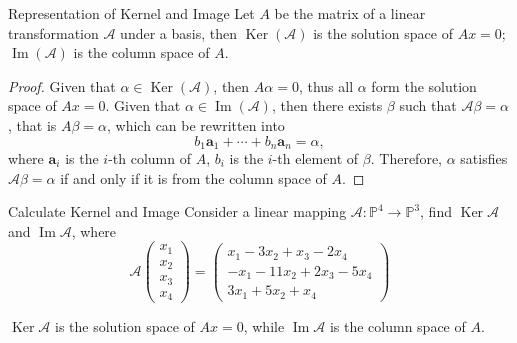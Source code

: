 \begin{proposition}{Representation of Kernel and Image}{}
  Let $A$ be the matrix of a linear transformation $\mathcal{A}$ under a basis,
  then $\operatorname{Ker}(\mathcal{A})$ is the solution space of $Ax = 0$;
  $\operatorname{Im}(\mathcal{A})$ is the column space of $A$.
\end{proposition}

\begin{proof}
  Given that $\alpha \in \operatorname{Ker}(\mathcal{A})$,
  then $A \alpha = 0$, thus all $\alpha$ form the solution space of $Ax = 0$.
  Given that $\alpha \in \operatorname{Im}(\mathcal{A})$,
  then there exists $\beta$ such that $\mathcal{A} \beta = \alpha$,
  that is $A\beta = \alpha$, which can be rewritten into
  \begin{equation}
    b_1\mathbf{a}_1 + \cdots + b_n \mathbf{a}_n = \alpha,
  \end{equation}
  where $\mathbf{a}_i$ is the $i$-th column of $A$,
  $b_i$ is the $i$-th element of $\beta$.
  Therefore, $\alpha$ satisfies $\mathcal{A} \beta = \alpha$
  if and only if it is from the column space of $A$.
\end{proof}

\begin{example}{Calculate Kernel and Image}{}
  Consider a linear mapping $\mathcal{A}: \mathbb{P}^4 \rightarrow
  \mathbb{P}^3$,
  find $\operatorname{Ker} \mathcal{A}$ and $\operatorname{Im} \mathcal{A}$, where
  \begin{equation}
    \mathcal{A}\begin{pmatrix}
    x_1 \\
    x_2 \\
    x_3 \\
    x_4
    \end{pmatrix}
    =
    \begin{pmatrix}
    x_1 - 3x_2 + x_3 - 2x_4 \\
    -x_1 - 11x_2 + 2x_3 - 5x_4 \\
    3x_1 + 5x_2 + x_4
    \end{pmatrix}
  \end{equation}
\end{example}

\begin{solution}
  $\operatorname{Ker} \mathcal{A}$ is the solution space of $Ax = 0$,
  while $\operatorname{Im} \mathcal{A}$ is the column space of $A$.
\end{solution}

